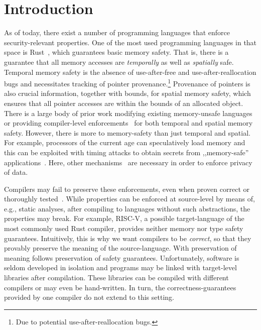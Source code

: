 
\section{Introduction}\label{sec:introduction}

  As of today, there exist a number of programming languages that enforce security-relevant properties.
  One of the most used programming languages in that space is Rust~\cite{}, which guarantees basic memory safety.
  That is, there is a guarantee that all memory accesses are {\em temporally} as well as {\em spatially} safe. 
  Temporal memory safety is the absence of use-after-free and use-after-reallocation bugs and necessitates tracking of pointer provenance.\footnote{Due to potential use-after-reallocation bugs.}
  Provenance of pointers is also crucial information, together with bounds, for spatial memory safety, which ensures that all pointer accesses are within the bounds of an allocated object.
  There is a large body of prior work modifying existing memory-unsafe languages~\cite{} or providing compiler-level enforcements~\cite{} for both temporal and spatial memory safety.
  However, there is more to memory-safety than just temporal and spatial.
  For example, processors of the current age can speculatively load memory and this can be exploited with timing attacks to obtain secrets from ,,memory-safe'' applications~\cite{}.
  Here, other mechanisms~\cite{} are necessary in order to enforce privacy of data.

  Compilers may fail to preserve these enforcements, even when proven correct or thoroughly tested~\cite{}.
  While properties can be enforced at source-level by means of, e.g., static analyses, after compiling to languages without such abstractions, the properties may break.
  For example, RISC-V, a possible target-language of the most commonly used Rust compiler, provides neither memory nor type safety guarantees.
  Intuitively, this is why we want compilers to be {\em correct}, so that they provably preserve the meaning of the source-language.
  With preservation of meaning follows preservation of safety guarantees.
  Unfortunately, software is seldom developed in isolation and programs may be linked with target-level libraries after compilation.
  These libraries can be compiled with different compilers or may even be hand-written.
  In turn, the correctness-guarantees provided by one compiler do not extend to this setting.

